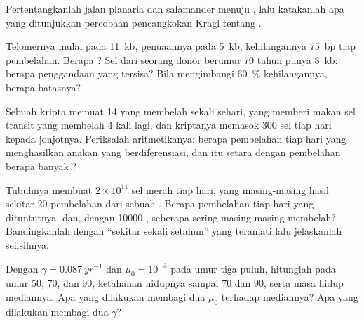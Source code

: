 \begin{exercise}[$\star$]\label{exo:b3:stem-cells:4}
Pertentangkanlah jalan planaria dan salamander menuju ,
lalu katakanlah apa yang ditunjukkan percobaan pencangkokan Kragl tentang .
\end{exercise}

\begin{exercise}[$\star\star$]\label{exo:b3:stem-cells:5}
Telomernya mulai pada \qty{11}{kb}, penuaannya pada \qty{5}{kb}, kehilangannya
\qty{75}{bp} tiap pembelahan. Berapa ? Sel dari seorang donor berumur 70
tahun punya \qty{8}{kb}: berapa penggandaan yang tersisa? Bila  mengimbangi
\qty{60}{\%} kehilangannya, berapa batasnya?
\end{exercise}

\begin{exercise}[$\star\star$]\label{exo:b3:stem-cells:6}
Sebuah kripta memuat 14  yang membelah sekali sehari, yang memberi makan sel transit
yang membelah 4 kali lagi, dan kriptanya memasok \num{300} sel tiap hari
kepada jonjotnya. Periksalah aritmetikanya: berapa pembelahan  tiap hari
yang menghasilkan anakan yang berdiferensiasi, dan itu setara dengan pembelahan berapa
banyak ?
\end{exercise}

\begin{exercise}[$\star\star$]\label{exo:b3:stem-cells:7}
Tubuhnya membuat $2\times 10^{11}$ sel merah tiap hari, yang masing-masing hasil
sekitar 20 pembelahan dari sebuah . Berapa pembelahan  tiap hari
yang dituntutnya, dan, dengan \num{10000} , seberapa sering masing-masing
membelah? Bandingkanlah dengan ``sekitar sekali setahun'' yang teramati lalu jelaskanlah
selisihnya.
\end{exercise}

\begin{exercise}[$\star\star$]\label{exo:b3:stem-cells:8}
Dengan $\gamma = \qty{0.087}{yr^{-1}}$ dan $\mu_{0} = 10^{-3}$ pada umur tiga puluh,
hitunglah  pada umur 50, 70, dan 90, ketahanan hidupnya sampai 70 dan 90, serta
masa hidup mediannya. Apa yang dilakukan membagi dua $\mu_{0}$ terhadap mediannya? Apa
yang dilakukan membagi dua $\gamma$?
\end{exercise}

